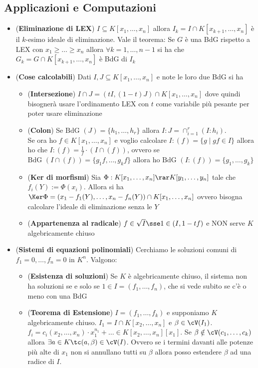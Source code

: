 \documentclass[a4paper,NoNotes,GeneralMath]{stdmdoc}
\newcommand{\BdG}{\text{BdG }}
\begin{document}
	\subsection*{Applicazioni e Computazioni}
	\begin{itemize}
		\item ({\bf Eliminazione di LEX}) $I \subseteq K[x_1, \ldots, x_n]$ allora $I_k = I \cap K[x_{k+1}, \ldots, x_n]$ è il $k$-esimo ideale di eliminazione. Vale il teorema: Se $G$ è una BdG rispetto a LEX con $x_1 \ge \ldots \ge x_n$ allora $\forall k = 1, \ldots, n-1$ si ha che $G_k = G \cap K[x_{k+1}, \ldots, x_n]$ è BdG di $I_k$
		\item ({\bf Cose calcolabili}) Dati $I, J \subseteq K[x_1, \ldots, x_n]$ e note le loro due BdG si ha
			\begin{itemize}
				\item ({\bf Intersezione}) $I \cap J = (tI, (1-t)J) \cap K[x_1, \ldots, x_n]$ dove quindi bisognerà usare l'ordinamento LEX con $t$ come variabile più pesante per poter usare eliminazione
				\item ({\bf Colon}) Se $\BdG(J) = \{h_1, \ldots, h_r\}$ allora $I : J = \cap_{i=1}^r (I : h_i)$. \\
					Se ora ho $f \in K[x_1, \ldots, x_n]$ e voglio calcolare $I : (f) = \{g \mid gf \in I\}$ allora ho che $I : (f) = \frac{1}{f} \cdot (I\cap (f))$, ovvero se $\BdG(I \cap (f)) = \{g_1 f, \ldots, g_k f\}$ allora ho $\BdG(I : (f)) = \{g_1, \ldots, g_k\}$
				\item ({\bf Ker di morfismi}) Sia $\Phi: K[x_1, \ldots, x_n] \rar K[y_1, \ldots, y_n]$ tale che $f_i(Y) := \Phi(x_i)$. Allora si ha $\Ker \Phi = (x_1 - f_1(Y), \ldots, x_n - f_n(Y)) \cap K[x_1, \ldots, x_n]$ ovvero bisogna calcolare l'ideale di eliminazione senza le $Y$
				\item ({\bf Appartenenza al radicale}) $f \in \sqrt{I} \sse 1 \in (I, 1-tf)$ e NON serve $K$ algebricamente chiuso
			\end{itemize}
		\item ({\bf Sistemi di equazioni polinomiali}) Cerchiamo le soluzioni comuni di $f_1 = 0, \ldots, f_n = 0$ in $K^n$. Valgono:
			\begin{itemize}
				\item ({\bf Esistenza di soluzioni}) Se $K$ è algebricamente chiuso, il sistema non ha soluzioni se e solo se $1 \in I = (f_1, \ldots, f_n)$, che si vede subito se c'è o meno con una BdG
				\item ({\bf Teorema di Estensione}) $I = (f_1, \ldots, f_k)$ e supponiamo $K$ algebricamente chiuso. $I_1 = I \cap K[x_2, \ldots, x_n]$ e $\beta \in \cV(I_1)$. $f_i = c_i(x_2, \ldots, x_n) \cdot x_1^{n_1} + \ldots \in K[x_2, \ldots, x_n][x_1]$. Se $\beta \notin \cV(c_1, \ldots, c_k)$ allora $\exists a \in K \tc (a, \beta) \in \cV(I)$. Ovvero se i termini davanti alle potenze più alte di $x_1$ non si annullano tutti su $\beta$ allora posso estendere $\beta$ ad una radice di $I$.

\end{itemize}
\end{itemize}
\end{document}
